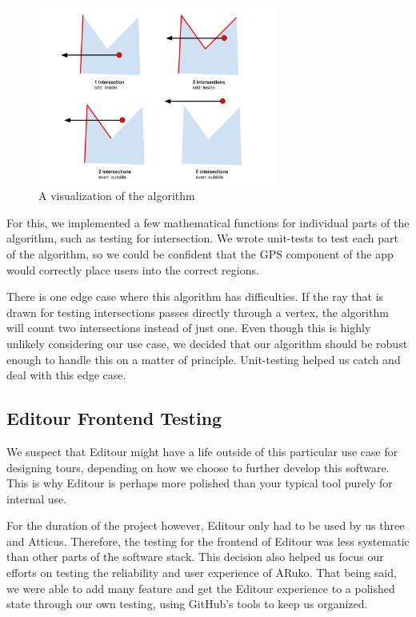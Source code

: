 \documentclass[a4paper, 10pt, american, titlepage]{article}
\begin{document}
\begin{figure}[h]
	\centering
	\includegraphics[width=0.7\textwidth]{intersections-diagram.png}
	\caption{A visualization of the algorithm}
	\label{fig:intersectionsDiagram}
\end{figure}

For this, we implemented a few mathematical functions for individual parts of
the algorithm, such as testing for intersection. We wrote unit-tests to test
each part of the algorithm, so we could be confident that the GPS component of
the app would correctly place users into the correct regions.

There is one edge case where this algorithm has difficulties. If the ray that
is drawn for testing intersections passes directly through a vertex, the
algorithm will count two intersections instead of just one. Even though this is
highly unlikely considering our use case, we decided that our algorithm should
be robust enough to handle this on a matter of principle. Unit-testing helped us
catch and deal with this edge case.

\subsection{Editour Frontend Testing}
\label{sec:editourFrontendTesting}

We suspect that Editour might have a life outside of this particular use case
for designing tours, depending on how we choose to further develop this
software. This is why Editour is perhaps more polished than your typical tool
purely for internal use.

For the duration of the project however, Editour only had to be used by us
three and Atticus. Therefore, the testing for the frontend of Editour was less
systematic than other parts of the software stack. This decision also helped us
focus our efforts on testing the reliability and user experience of ARuko. That
being said, we were able to add many feature and get the Editour experience to
a polished state through our own testing, using GitHub's tools to keep us
organized.
\end{document}
